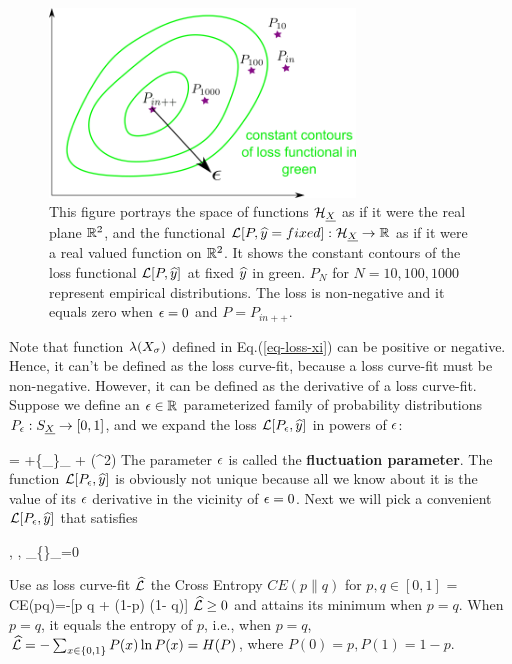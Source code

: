 \begin{figure}[h!]
\centering
\includegraphics[width=3.2in]
{targeted-est/targeted-est.png}
\caption{
This figure portrays
the space of functions ${\cal H}_{\underline{X}}$
as if it were the real plane ${ \mathbb{R}}^2$,
and the functional ${\cal L}[P, {\widehat{y}}=fixed]:{\cal H}_{\underline{X}}
\rightarrow{ \mathbb{R}}$
as if it were a real valued function on ${ \mathbb{R}}^2$.
It shows  the constant contours
of the loss functional ${\cal L}[P, {\widehat{y}}]$
at fixed ${\widehat{y}}$ in green.
$P_N$ for $N=10, 100, 1000$
represent empirical distributions.
The loss is non-negative and it equals
zero when $\epsilon=0$ and $P=P_{in++}$.
}
\label{fig-targeted-est}
\end{figure}

Note that function $\lambda(X_\sigma)$ defined in Eq.(\ref{eq-loss-xi})
can be positive or negative. Hence,
 it can't be defined as the loss curve-fit,
because a loss curve-fit must be non-negative. However, it can be
defined as the derivative of a loss curve-fit. Suppose we define an $\epsilon\in{ \mathbb{R}}$
parameterized
family of probability distributions $P_\epsilon:S_{\underline{X}}\rightarrow [0,1]$,
and we expand the loss ${\cal L}[P_\epsilon, {\widehat{y}}]$
in powers of $\epsilon$:

\beq
{} = \call[P_0, \haty]
+\eps \{\partial_\eps {}\}_{} + \calo(\eps^2)
\eeq
The parameter $\epsilon$ is called the {\bf fluctuation parameter}.
The function ${\cal L}[P_\epsilon, {\widehat{y}}]$ is obviously
not unique because all we know about it
is the value of its $\epsilon$ derivative
in the vicinity of $\epsilon=0$. Next we will pick a convenient
${\cal L}[P_\epsilon, {\widehat{y}}]$ that satisfies

\beq
{},\quad
{}, \quad \partial_\eps \{\}_{}=0
\eeq


Use as loss curve-fit ${\widehat{{\cal L}}}$ the Cross Entropy
$CE(p\parallel q)$ for $p, q\in [0,1]$
\beq
\hatl = CE(p\parallel q)=-[p \ln q + (1-p) \ln(1- q)]
\eeq
${\widehat{{\cal L}}}\geq 0$ and attains its minimum when $p=q$.
When $p=q$, it equals the entropy of $p$,
i.e., when $p=q$, ${\widehat{{\cal L}}}=-\sum_{x\in \{0,1\}} P(x)\ln P(x)= H(P)$,
where $P(0)=p, P(1)=1-p$.


